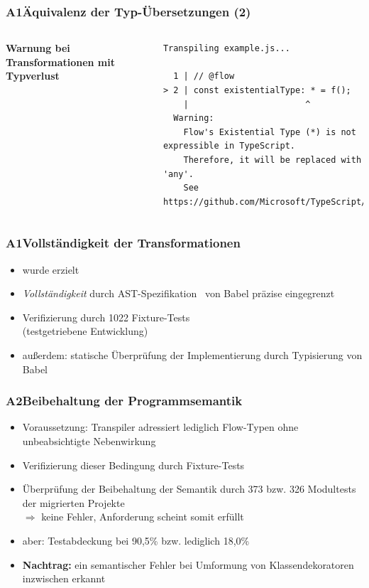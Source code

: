       \begin{frame}[fragile]
        \frametitle{A1\hspace{0.75em}Äquivalenz der Typ-Übersetzungen (2)}
        \begin{columns}
          \column{\dimexpr\paperwidth-16mm}
          \textbf{Warnung bei Transformationen mit Typverlust}
          \vspace{1.5em}
          \begin{lstlisting}[emph={Warning},numbers=none]
Transpiling example.js...

  1 | // @flow
> 2 | const existentialType: * = f();
    |                       ^
  Warning:
    Flow's Existential Type (*) is not expressible in TypeScript.
    Therefore, it will be replaced with 'any'.
    See https://github.com/Microsoft/TypeScript/issues/14466.
            \end{lstlisting}
        \end{columns}

      \end{frame}

      \begin{frame}
        \frametitle{A1\hspace{0.75em}Vollständigkeit der Transformationen}
        \begin{itemize}
          \item wurde erzielt
          \item \textit{Vollständigkeit} durch AST-Spezifikation~\autocite{BABEL:PARSER_SPEC} von Babel präzise eingegrenzt
          \item Verifizierung durch 1022 Fixture-Tests\\(testgetriebene Entwicklung)
          \item außerdem: statische Überprüfung der Implementierung durch Typisierung von Babel
        \end{itemize}
      \end{frame}

      \begin{frame}
        \frametitle{A2\hspace{0.75em}Beibehaltung der Programmsemantik}
          \begin{itemize}
            \item Voraussetzung: Transpiler adressiert lediglich Flow-Typen ohne unbeabsichtigte Nebenwirkung
            \item Verifizierung dieser Bedingung durch Fixture-Tests
            \item Überprüfung der Beibehaltung der Semantik durch 373 bzw. 326 Modultests der migrierten Projekte\\
              \smallskip
              $\Rightarrow$ keine Fehler, Anforderung scheint somit erfüllt
            \item aber: Testabdeckung bei 90,5\% bzw. lediglich 18,0\%
            \item \textbf{Nachtrag:} ein semantischer Fehler bei Umformung von Klassendekoratoren inzwischen erkannt
          \end{itemize}
      \end{frame}

